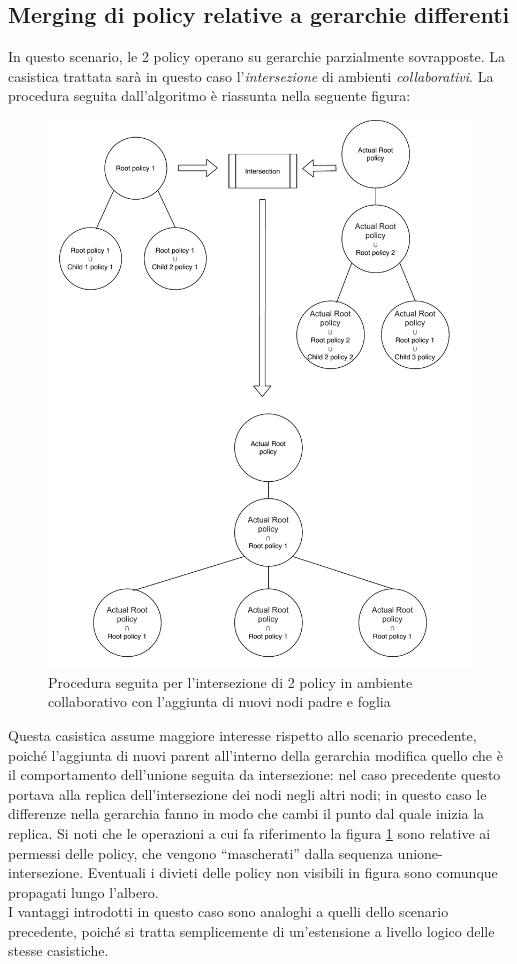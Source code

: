 \documentclass[12pt,a4paper,twoside]{book}
\begin{document}
\subsection{Merging di policy relative a gerarchie differenti}
In questo scenario, le 2 policy operano su gerarchie parzialmente sovrapposte. La casistica trattata sarà in questo caso l'\textit{intersezione} di ambienti \textit{collaborativi}. La procedura seguita dall'algoritmo è riassunta nella seguente figura:
\begin{figure}[H]
\centering
\includegraphics[scale=.5]{../immagini/treeNewNodesExample.pdf}
\caption{Procedura seguita per l'intersezione di 2 policy in ambiente collaborativo con l'aggiunta di nuovi nodi padre e foglia}
\label{treeNewNodeExample}
\end{figure}
Questa casistica assume maggiore interesse rispetto allo scenario precedente, poiché l'aggiunta di nuovi parent all'interno della gerarchia modifica quello che è il comportamento dell'unione seguita da intersezione: nel caso precedente questo portava alla replica dell'intersezione dei nodi negli altri nodi; in questo caso le differenze nella gerarchia fanno in modo che cambi il punto dal quale inizia la replica. Si noti che le operazioni a cui fa riferimento la figura \ref{treeNewNodeExample} sono relative ai permessi delle policy, che vengono ``mascherati'' dalla sequenza unione-intersezione. Eventuali i divieti delle policy non visibili in figura sono comunque propagati lungo l'albero.\\
I vantaggi introdotti in questo caso sono analoghi a quelli dello scenario precedente, poiché si tratta semplicemente di un'estensione a livello logico delle stesse casistiche. 
\end{document}
